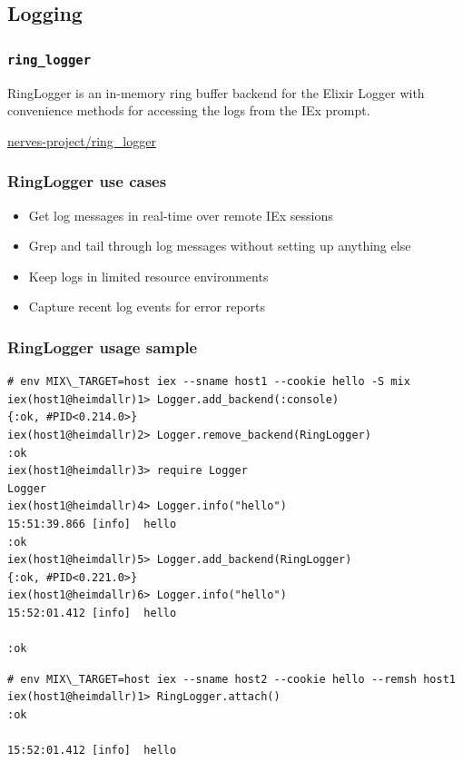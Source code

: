 \documentclass[10pt,xcolor=pdflatex,dvipsnames,table]{beamer}
\begin{document}
\subsection{Logging}

\begin{frame}[standout]
\frametitle{\texttt{ring\_logger}}

{\color{white}
RingLogger is an in-memory ring buffer backend for the Elixir Logger with convenience methods for accessing the logs from the IEx prompt.

\faGithub \hspace{1pt} \href{https://github.com/nerves-project/ring_logger}{nerves-project/ring\_logger}
}
\end{frame}

\begin{frame}
  \frametitle{RingLogger use cases}

  \begin{itemize}
    \item Get log messages in real-time over remote IEx sessions
    \item Grep and tail through log messages without setting up anything else
    \item Keep logs in limited resource environments
    \item Capture recent log events for error reports
    \end{itemize}
  \end{frame}

\begin{frame}[fragile]
\frametitle{RingLogger usage sample}

\begin{example}
\begin{verbatim}
# env MIX\_TARGET=host iex --sname host1 --cookie hello -S mix
iex(host1@heimdallr)1> Logger.add_backend(:console)
{:ok, #PID<0.214.0>}
iex(host1@heimdallr)2> Logger.remove_backend(RingLogger)
:ok
iex(host1@heimdallr)3> require Logger
Logger
iex(host1@heimdallr)4> Logger.info("hello")
15:51:39.866 [info]  hello
:ok
iex(host1@heimdallr)5> Logger.add_backend(RingLogger)
{:ok, #PID<0.221.0>}
iex(host1@heimdallr)6> Logger.info("hello")
15:52:01.412 [info]  hello

:ok
\end{verbatim}
\end{example}

\begin{example}
\begin{verbatim}
# env MIX\_TARGET=host iex --sname host2 --cookie hello --remsh host1
iex(host1@heimdallr)1> RingLogger.attach()
:ok

15:52:01.412 [info]  hello
\end{verbatim}
\end{example}
\end{frame}
\end{document}
